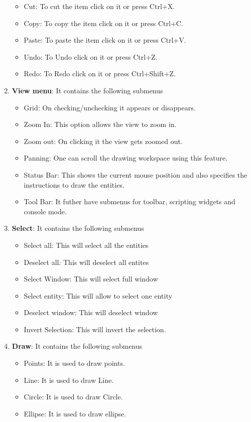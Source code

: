 \begin{enumerate}
\begin{itemize}
\item Cut: To cut the item click on it or press Ctrl+X.
\item Copy: To copy the item click on it or press Ctrl+C.
\item Paste: To paste the item click on it or press Ctrl+V.
\item Undo: To Undo click on it or press Ctrl+Z.
\item Redo: To Redo click on it or press Ctrl+Shift+Z.
\end{itemize}
\item \textbf{View menu}: It contains the following submenus
\begin{itemize}
\item Grid: On checking/unchecking it appears or disappears.
\item Zoom In: This option allows the view to zoom in.
\item Zoom out: On clicking it the view gets zoomed out.
\item Panning: One can scroll the drawing workspace using this feature.
\item Status Bar: This shows the current mouse position and also specifies the instructions to draw the entities.
\item Tool Bar: It futher have submenus for toolbar, scripting widgets and console mode.
\end{itemize}
\item \textbf{Select}: It contains the following submenus
\begin{itemize}
\item Select all: This will select all the entities
\item Deselect all: This will deselect all entites 
\item Select Window: This will select full window
\item Select entity: This will allow to select one entity
\item Deselect window: This will deselect window 
\item Invert Selection: This will invert the selection.
\end{itemize}
\item \textbf{Draw}: It contains the following submenus
\begin{itemize}
\item Points: It is used to draw points.
\item Line: It is used to draw Line.
\item Circle: It is used to draw Circle.
\item Ellipse: It is used to draw ellipse.

\end{itemize}
\end{enumerate}
